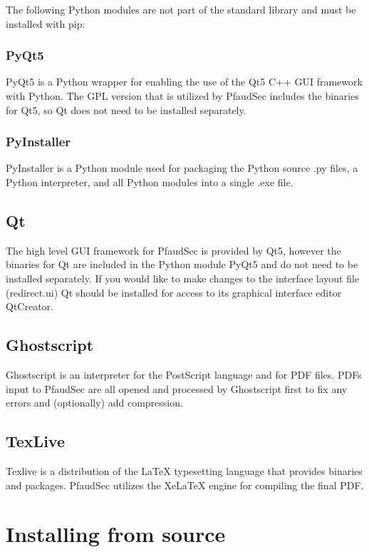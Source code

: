 \documentclass[14pt]{article}
\begin{document}
\begin{flushleft}
The following Python modules are not part of the standard library and must be installed with pip:

		\begin{subs}
		\subsubsection{PyQt5}
PyQt5 is a Python wrapper for enabling the use of the Qt5 C++ GUI framework with Python.
The GPL version that is utilized by PfaudSec includes the binaries for Qt5, so Qt does not need to be installed separately.

		\subsubsection{PyInstaller}
PyInstaller is a Python module used for packaging the Python source .py files, a Python interpreter, and all Python modules into a single .exe file.
		\end{subs}

	\subsection{Qt}
The high level GUI framework for PfaudSec is provided by Qt5, however the binaries for Qt are included in the Python module PyQt5 and do not need to be installed separately.
If you would like to make changes to the interface layout file (redirect.ui) Qt should be installed for access to its graphical interface editor QtCreator.

	\subsection{Ghostscript}
Ghostscript is an interpreter for the PostScript language and for PDF files.
PDFs input to PfaudSec are all opened and processed by Ghostscript first to fix any errors and (optionally) add compression.

	\subsection{TexLive}
Texlive is a distribution of the \LaTeX\xspace typesetting language that provides binaries and packages.
PfaudSec utilizes the XeLaTeX engine for compiling the final PDF.

\section{Installing from source}
\label{sec:install}


\end{flushleft}
\end{document}
